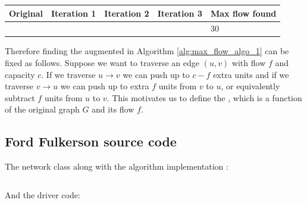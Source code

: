\documentclass[a4paper]{article}
\begin{document}
\begin{minipage}{\linewidth}
\label{tab:greedy_alg_1_results}
\begin{center}
\begin{tabular}{| m{} | m{} | m{}  | m{} | m{} |}
\hline   
    \textbf{Original} & \textbf{Iteration 1} & \textbf{Iteration 2} & \textbf{Iteration 3} & \textbf{Max flow found}\\
\hline 
\hline 
     &
     &
      &  & 30\\
\hline 

\end{tabular}
\end{center}
\end{minipage}

Therefore finding the augmented in Algorithm \ref{alg:max_flow_algo_1} can be fixed as follows. Suppose we want to traverse an edge $(u,v)$ with flow $f$ and capacity $c$. If we traverse $u\rightarrow v$ we can push up to $c-f$ extra units and if we traverse $v\rightarrow u$ we can push up to extra $f$ units from $v$ to $u$, or equivalently subtract $f$ units from $u$ to $v$. This motivates us to define the , which is a function of the original graph $G$ and its flow $f$. 




\newpage
\subsection{Ford Fulkerson source code}
\label{app:ffa_code}

The network class along with the algorithm implementation :
\inputminted{python}{src/ford-fulkerson/class_network.py}
And the driver code:
\inputminted{python}{src/ford-fulkerson/main.py}

\newpage
\end{document}
